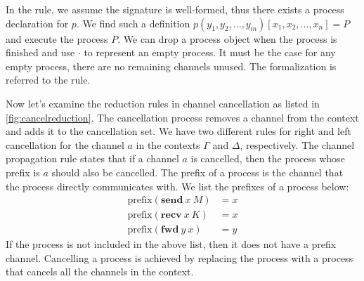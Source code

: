 \documentclass[12pt, openany]{memoir}
\newcommand*{\send}[2]{\textbf{send}\ #1\ #2}
\newcommand*{\recv}[2]{\textbf{recv}\ #1\ #2}
\newcommand*{\fwd}[2]{\textbf{fwd}\ #1\ #2}
\begin{document}
In the  rule, we assume the signature is well-formed, thus there exists a process declaration for $p$. 
We find such a definition $p (y_1, y_2, \ldots, y_m) [x_1, x_2, \ldots, x_n] = P$ and execute the process $P$. 
We can drop a process object when the process is finished and use $\cdot$ to represent an empty process. 
It must be the case for any empty process, there are no remaining channels unused.
The formalization is referred to the  rule.

Now let's examine the reduction rules in channel cancellation as listed in \cref{fig:cancelreduction}.
The cancellation process removes a channel from the context and adds it to the cancellation set.
We have two different rules for right and left cancellation for the channel $a$ in the contexts $\Gamma$ and $\Delta$, respectively.
The channel propagation rule states that if a channel $a$ is cancelled, then the process whose prefix is $a$ should also be cancelled.
The prefix of a process is the channel that the process directly communicates with. We list the prefixes of a process below:
\begin{align*}
  \text{prefix}(\send{x}{M}) &= x \\
  \text{prefix}(\recv{x}{K}) &= x \\
  \text{prefix}(\fwd{y}{x}) &= y
\end{align*}
If the process is not included in the above list, then it does not have a prefix channel.
Cancelling a process is achieved by replacing the process with a process that cancels all the channels in the context. 
\end{document}
